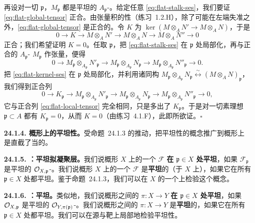 再设对一切 $\mathfrak{p}$，$M_{\mathfrak{p}}$ 都是平坦的 $A_{\mathfrak{p}}$-\trModule。给定任意\trShortExactSequence{} \eqref{eq:flat-stalk-ses}，我们要证 \eqref{eq:flat-global-tensor} 正合。由张量积的\trRightExact{}性（\mbox{练习~1.2.H}），除了可能在左端失准之外，\eqref{eq:flat-global-tensor} 是正合的。令 $K$ 为 $\ker(M\otimes_A N'\to M\otimes_A N)$，于是
\[
\tag{24.1.3.4}\label{eq:flat-kernel-ses}
0 \longrightarrow K \longrightarrow M\otimes_A N' \longrightarrow M\otimes_A N \longrightarrow M\otimes_A N'' \longrightarrow 0
\]
正合；我们希望证明 $K=0$。任取 $\mathfrak{p}$，把 \eqref{eq:flat-stalk-ses} 在 $\mathfrak{p}$ 处局部化，再与正合的 $A_{\mathfrak{p}}$-\trModule{} $M_{\mathfrak{p}}$ 作张量，便得
\[
\tag{24.1.3.5}\label{eq:flat-local-tensor}
0 \longrightarrow M_{\mathfrak{p}}\otimes_{A_{\mathfrak{p}}} N'_{\mathfrak{p}} \longrightarrow M_{\mathfrak{p}}\otimes_{A_{\mathfrak{p}}} N_{\mathfrak{p}} \longrightarrow M_{\mathfrak{p}}\otimes_{A_{\mathfrak{p}}} N''_{\mathfrak{p}} \longrightarrow 0.
\]
把 \eqref{eq:flat-kernel-ses} 在 $\mathfrak{p}$ 处局部化，并利用诸同构 $M_{\mathfrak{p}}\otimes_{A_{\mathfrak{p}}}N_{\mathfrak{p}}\overset{\sim}{\longleftrightarrow}(M\otimes_A N)_{\mathfrak{p}}$，我们得到正合列
\[
0 \longrightarrow K_{\mathfrak{p}} \longrightarrow M_{\mathfrak{p}}\otimes_{A_{\mathfrak{p}}} N'_{\mathfrak{p}} \longrightarrow M_{\mathfrak{p}}\otimes_{A_{\mathfrak{p}}} N_{\mathfrak{p}} \longrightarrow M_{\mathfrak{p}}\otimes_{A_{\mathfrak{p}}} N''_{\mathfrak{p}} \longrightarrow 0,
\]
它与正合列 \eqref{eq:flat-local-tensor} 完全相同，只是多出了 $K_{\mathfrak{p}}$。于是对一切素理想 $\mathfrak{p}\subset A$ 都有 $K_{\mathfrak{p}}=0$，从而 $K=0$（由\mbox{练习~4.1.F}），此即所欲证。\hfill$\square$

\textbf{24.1.4. 概形上的平坦性。}\quad 受\mbox{命题~24.1.3} 的推动，把平坦性的概念推广到概形上是直截了当的。

\textbf{24.1.5. \trhDefinition{}：平坦拟凝聚层。}\quad 我们说概形 $X$ 上的一个\trQCSheaf{} $\mathscr{F}$ \textbf{在 $\mathfrak{p}\in X$ 处平坦}，如果 $\mathscr{F}_{\mathfrak{p}}$ 是平坦的 $\mathcal{O}_{X,\mathfrak{p}}$-\trModule。我们说概形 $X$ 上的一个\trQCSheaf{} $\mathscr{F}$ 是\textbf{平坦}的（于 $X$ 上），如果它在所有 $\mathfrak{p}\in X$ 处都平坦。鉴于\mbox{命题~24.1.3}，我们可以在 $X$ 的一个\trAffine\trOpenCover{}上检验这个概念。

\textbf{24.1.6. \trhDefinition{}：平坦\trMorphism。}\quad 类似地，我们说概形之间的\trMorphism{} $\pi\colon X\to Y$ \textbf{在 $\mathfrak{p}\in X$ 处平坦}，如果 $\mathcal{O}_{X,\mathfrak{p}}$ 是平坦的 $\mathcal{O}_{Y,\pi(\mathfrak{p})}$-\trModule。我们说概形之间的\trMorphism{} $\pi\colon X\to Y$ 是\textbf{平坦}的，如果它在所有 $\mathfrak{p}\in X$ 处都平坦。我们可以在源与靶上局部地检验平坦性。

